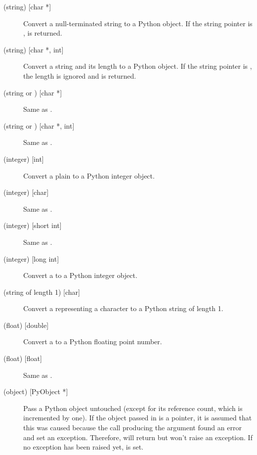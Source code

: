 \documentclass{manual}
\begin{document}
\begin{description}

\item[ (string) {[char *]}]
Convert a null-terminated \C{} string to a Python object.  If the \C{}
string pointer is \NULL{},  is returned.

\item[ (string) {[char *, int]}]
Convert a \C{} string and its length to a Python object.  If the \C{} string
pointer is \NULL{}, the length is ignored and  is
returned.

\item[ (string or ) {[char *]}]
Same as .

\item[ (string or ) {[char *, int]}]
Same as .

\item[ (integer) {[int]}]
Convert a plain \C{}  to a Python integer object.

\item[ (integer) {[char]}]
Same as .

\item[ (integer) {[short int]}]
Same as .

\item[ (integer) {[long int]}]
Convert a \C{}  to a Python integer object.

\item[ (string of length 1) {[char]}]
Convert a \C{}  representing a character to a Python string of
length 1.

\item[ (float) {[double]}]
Convert a \C{}  to a Python floating point number.

\item[ (float) {[float]}]
Same as .

\item[ (object) {[PyObject *]}]
Pass a Python object untouched (except for its reference count, which
is incremented by one).  If the object passed in is a \NULL{}
pointer, it is assumed that this was caused because the call producing
the argument found an error and set an exception.  Therefore,
 will return \NULL{} but won't raise an
exception.  If no exception has been raised yet,
 is set.


\end{description}
\end{document}
